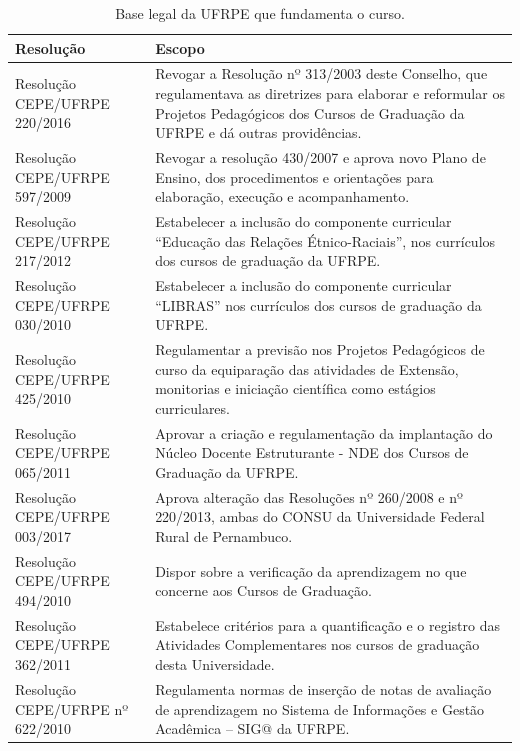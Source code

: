 \documentclass[
	12pt,				%
	openright,			%
  oneside,     %
	a4paper,			%
	english,			%
	french,				%
	spanish,			%
	brazil				%
	]{abntex2}
\begin{document}
\begin{center}
    
    \begin{scriptsize}
        \begin{longtable}{@{}lp{8.7cm}}
            \caption{\label{quadro:base-legal-ufrpe-curso}Base legal da UFRPE que fundamenta o curso.}\\
    \toprule
    \textbf{Resolução} & \textbf{Escopo} \\
    \midrule
    Resolução CEPE/UFRPE 220/2016 & Revogar a Resolução nº 313/2003 deste Conselho, que regulamentava as diretrizes para elaborar e reformular os Projetos Pedagógicos dos 	Cursos de Graduação da UFRPE e dá outras providências. \\ \midrule
    Resolução CEPE/UFRPE 597/2009 & Revogar a resolução 430/2007 e aprova novo Plano de Ensino, dos 	procedimentos e orientações para elaboração, execução e acompanhamento. \\ \midrule
    Resolução CEPE/UFRPE 217/2012 &	Estabelecer a inclusão do componente curricular ``Educação das Relações Étnico-Raciais'', nos currículos dos cursos de graduação da UFRPE. \\ \midrule
    Resolução CEPE/UFRPE 030/2010 & Estabelecer a inclusão do componente curricular ``LIBRAS'' nos 	currículos dos cursos de graduação da UFRPE. \\ \midrule
    Resolução CEPE/UFRPE 425/2010 &	Regulamentar a previsão nos Projetos Pedagógicos de curso da equiparação das atividades de Extensão, monitorias e iniciação científica como estágios curriculares. \\ \midrule
    Resolução CEPE/UFRPE 065/2011 & Aprovar a criação e regulamentação da implantação do Núcleo Docente Estruturante - NDE dos Cursos de Graduação da UFRPE. \\ \midrule
    Resolução CEPE/UFRPE 003/2017 &	Aprova alteração das Resoluções nº 260/2008 e nº 220/2013, ambas do CONSU da Universidade Federal Rural de Pernambuco. \\ \midrule
    Resolução CEPE/UFRPE 494/2010 & Dispor 	sobre a verificação da aprendizagem no que concerne aos Cursos de Graduação. \\ \midrule
    Resolução CEPE/UFRPE 362/2011 & Estabelece 	critérios para a quantificação e o registro das Atividades Complementares nos cursos de graduação desta Universidade. \\ \midrule
    Resolução CEPE/UFRPE nº 622/2010 & Regulamenta normas de inserção de notas de avaliação de aprendizagem no Sistema de Informações e Gestão Acadêmica – SIG@ da UFRPE. \\ \midrule

\end{longtable}
\end{scriptsize}
\end{center}
\end{document}
